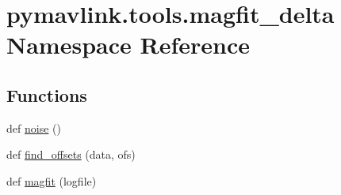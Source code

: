 \hypertarget{namespacepymavlink_1_1tools_1_1magfit__delta}{}\section{pymavlink.\+tools.\+magfit\+\_\+delta Namespace Reference}
\label{namespacepymavlink_1_1tools_1_1magfit__delta}
\subsection*{Functions}
\begin{DoxyCompactItemize}
\item 
def \hyperlink{namespacepymavlink_1_1tools_1_1magfit__delta_a916fe58238a78962c0fe73909e6acafe}{noise} ()
\item 
def \hyperlink{namespacepymavlink_1_1tools_1_1magfit__delta_a9ac6d8af876f202d906aadabe7c39e46}{find\+\_\+offsets} (data, ofs)
\item 
def \hyperlink{namespacepymavlink_1_1tools_1_1magfit__delta_a29df37e1c387e2a17988c9028c7c9b6e}{magfit} (logfile)
\end{DoxyCompactItemize}
